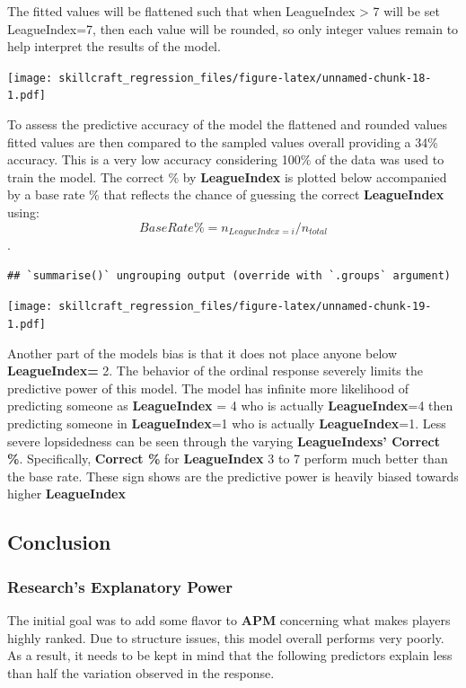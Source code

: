 \documentclass[]{article}
\begin{document}
The fitted values will be flattened such that when LeagueIndex
\textgreater{} 7 will be set LeagueIndex=7, then each value will be
rounded, so only integer values remain to help interpret the results of
the model.

\texttt{[image: skillcraft\_regression\_files/figure-latex/unnamed-chunk-18-1.pdf]}

To assess the predictive accuracy of the model the flattened and rounded
values fitted values are then compared to the sampled values overall
providing a 34\% accuracy. This is a very low accuracy considering 100\%
of the data was used to train the model. The correct \% by
\textbf{LeagueIndex} is plotted below accompanied by a base rate \% that
reflects the chance of guessing the correct \textbf{LeagueIndex} using:
\[BaseRate\%=n_{LeagueIndex=i}/n_{total}\].

\begin{verbatim}
## `summarise()` ungrouping output (override with `.groups` argument)
\end{verbatim}

\texttt{[image: skillcraft\_regression\_files/figure-latex/unnamed-chunk-19-1.pdf]}

Another part of the models bias is that it does not place anyone below
\textbf{LeagueIndex=} 2. The behavior of the ordinal response severely
limits the predictive power of this model. The model has infinite more
likelihood of predicting someone as \textbf{LeagueIndex} = 4 who is
actually \textbf{LeagueIndex}=4 then predicting someone in
\textbf{LeagueIndex}=1 who is actually \textbf{LeagueIndex}=1. Less
severe lopsidedness can be seen through the varying
\textbf{LeagueIndexs' Correct \%}. Specifically, \textbf{Correct \%} for
\textbf{LeagueIndex} 3 to 7 perform much better than the base rate.
These sign shows are the predictive power is heavily biased towards
higher \textbf{LeagueIndex}

\hypertarget{conclusion}{%
\subsection{Conclusion}\label{conclusion}}

\hypertarget{researchs-explanatory-power}{%
\subsubsection{Research's Explanatory
Power}\label{researchs-explanatory-power}}

The initial goal was to add some flavor to \textbf{APM} concerning what
makes players highly ranked. Due to structure issues, this model overall
performs very poorly. As a result, it needs to be kept in mind that the
following predictors explain less than half the variation observed in
the response.
\end{document}
